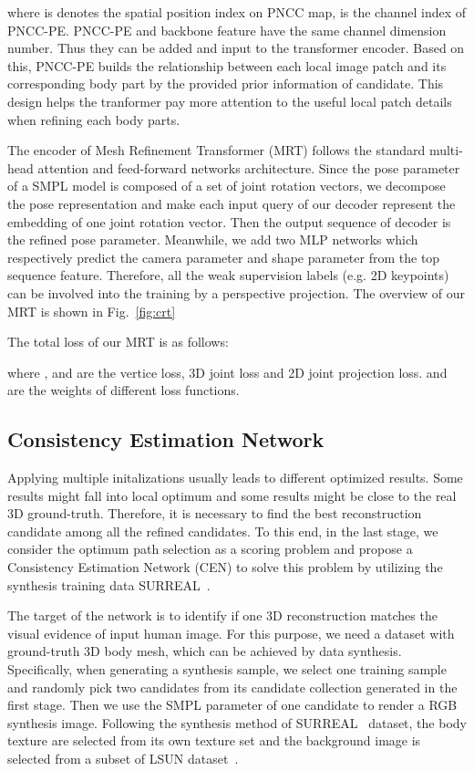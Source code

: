 \documentclass[sigconf]{acmart}
\begin{document}
where  is denotes the spatial position index on PNCC map,  is the channel index of PNCC-PE. PNCC-PE and 
backbone feature have the same channel dimension number. Thus they can be added and input to the transformer encoder. 
Based on this, PNCC-PE builds the relationship between each local image patch and 
its corresponding body part by the provided prior information of candidate. 
This design helps the tranformer pay more attention to the useful local patch details when refining each body parts. 

The encoder of Mesh Refinement Transformer 
(MRT) follows the standard multi-head attention and feed-forward networks architecture. 
Since the pose parameter of a SMPL model is composed of a set of joint rotation vectors, we decompose the pose 
representation and make each input query of our decoder represent the embedding of one joint rotation vector. 
Then the output sequence of decoder is the refined pose parameter. 
Meanwhile, we add two MLP networks which respectively predict the camera parameter and shape parameter from the 
top sequence feature. 
Therefore, all the weak supervision labels (e.g. 2D keypoints) 
can be involved into the training by a perspective projection. The overview of our MRT is shown in Fig.~\ref{fig:crt}

The total loss of our MRT is as follows:




where ,  and  are the vertice loss, 3D joint loss and 2D joint projection loss. 
 and  are the weights of different loss functions. 

\subsection{Consistency Estimation Network}
Applying multiple initalizations usually leads to different optimized results. Some results might fall into 
local optimum and some results might be close to the real 3D ground-truth. Therefore, it is necessary to find the best reconstruction 
candidate among all the refined candidates. To this end, in the last stage, we consider the optimum path selection as a 
scoring problem and propose a Consistency Estimation Network (CEN) to solve this problem by utilizing the synthesis 
training data SURREAL~\cite{varol2017learning}.

The target of the network is to identify 
if one 3D reconstruction matches the visual evidence of input human image. For this purpose, 
we need a dataset with ground-truth 3D body mesh, which can be achieved by data synthesis.
Specifically, when generating a synthesis sample, we select one training sample and randomly pick two candidates from 
its candidate collection generated in the first stage. 
Then we use the SMPL parameter of one candidate to render a RGB synthesis image. Following the synthesis 
method of SURREAL~\cite{varol2017learning} dataset, the body texture are selected from 
its own texture set and the background image is selected from a subset of LSUN dataset~\cite{yu2015lsun}.
\end{document}

